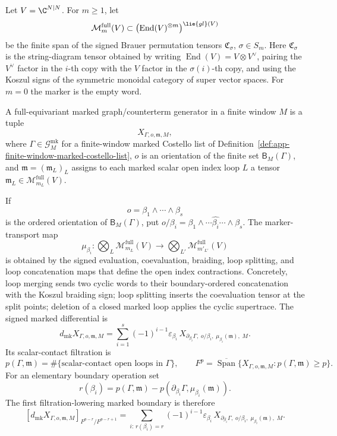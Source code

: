 \begin{defn}
\label{def:app-oriented-full-equivariant-marked-boundary-complex}
  Let \(V=\C^{N|N}\).  For \(m\geq1\), let
  \[
    \mathcal M_m^{\mathrm{full}}(V)
      \subset
    \bigl(\operatorname{End}(V)^{\otimes m}\bigr)^{\lie{gl}(V)}
  \]
  be the finite span of the signed Brauer permutation tensors
  \(\mathfrak C_\sigma\), \(\sigma\in S_m\).  Here
  \(\mathfrak C_\sigma\) is the string-diagram tensor obtained by
  writing
  \(\operatorname{End}(V)=V\otimes V^\vee\), pairing the \(V^\vee\)
  factor in the \(i\)-th copy with the \(V\) factor in the
  \(\sigma(i)\)-th copy, and using the Koszul signs of the symmetric
  monoidal category of super vector spaces.  For \(m=0\) the marker is
  the empty word.

  A full-equivariant marked graph/counterterm generator in a finite
  window \(M\) is a tuple
  \[
    X_{\Gamma,o,\mathfrak m,M},
  \]
  where \(\Gamma\in\mathcal G^{\mathrm{mk}}_M\) for a finite-window
  marked Costello list of
  Definition~\ref{def:app-finite-window-marked-costello-list},
  \(o\) is an orientation of the finite set
  \(\mathsf B_M(\Gamma)\), and
  \(\mathfrak m=(\mathfrak m_L)_L\) assigns to each marked scalar open
  index loop \(L\) a tensor
  \(\mathfrak m_L\in\mathcal M_{m_L}^{\mathrm{full}}(V)\).

  If
  \[
    o=\beta_1\wedge\cdots\wedge\beta_s
  \]
  is the ordered orientation of \(\mathsf B_M(\Gamma)\), put
  \(o/\beta_i=\beta_1\wedge\cdots\widehat{\beta_i}\cdots\wedge\beta_s\).
  The marker-transport map
  \[
    \mu_{\beta_i}\colon
    \bigotimes_L\mathcal M_{m_L}^{\mathrm{full}}(V)
    \longrightarrow
    \bigotimes_{L'}\mathcal M_{m'_{L'}}^{\mathrm{full}}(V)
  \]
  is obtained by the signed evaluation, coevaluation, braiding, loop
  splitting, and loop concatenation maps that define the open index
  contractions.  Concretely, loop merging sends two cyclic words to their
  boundary-ordered concatenation with the Koszul braiding sign; loop
  splitting inserts the coevaluation tensor at the split points; deletion
  of a closed marked loop applies the cyclic supertrace.  The signed
  marked differential is
  \[
    d_{\mathrm{mk}}X_{\Gamma,o,\mathfrak m,M}
      =
    \sum_{i=1}^{s}
      (-1)^{i-1}
      \varepsilon_{\beta_i}\,
      X_{\partial_{\beta_i}\Gamma,\;o/\beta_i,\;
        \mu_{\beta_i}(\mathfrak m),\;M}.
    \label{eq:app-oriented-marked-differential}
  \]
  Its scalar-contact filtration is
  \[
    p(\Gamma,\mathfrak m)
      =
    \#\{\text{scalar-contact open loops in }\Gamma\},
    \qquad
    F^p=\overline{\operatorname{Span}}\{X_{\Gamma,o,\mathfrak m,M}
      :p(\Gamma,\mathfrak m)\geq p\}.
  \]
  For an elementary boundary operation set
  \[
    r(\beta_i)
      =
    p(\Gamma,\mathfrak m)
      -p(\partial_{\beta_i}\Gamma,\mu_{\beta_i}(\mathfrak m)).
  \]
  The first filtration-lowering marked boundary is therefore
  \[
    \left[d_{\mathrm{mk}}X_{\Gamma,o,\mathfrak m,M}
    \right]_{F^{p-r}/F^{p-r+1}}
      =
    \sum_{i:\,r(\beta_i)=r}
      (-1)^{i-1}
      \varepsilon_{\beta_i}\,
      X_{\partial_{\beta_i}\Gamma,\;o/\beta_i,\;
        \mu_{\beta_i}(\mathfrak m),\;M}.
    \label{eq:app-oriented-marked-first-lowering}
  \]
\end{defn}

